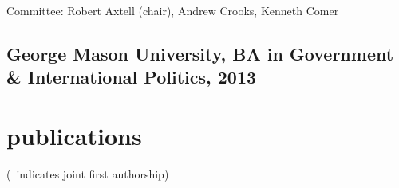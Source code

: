 \documentclass[11pt, letter]{article}
\begin{document}
Committee: Robert Axtell (chair), Andrew Crooks, Kenneth Comer
\subsection{George Mason University, BA in Government \& International Politics,
  2013}

\vspace{2mm}

\section{publications}
\vspace{1mm} {\footnotesize (\textdagger\, indicates joint first authorship)}
\subsection*{} %
\end{document}
